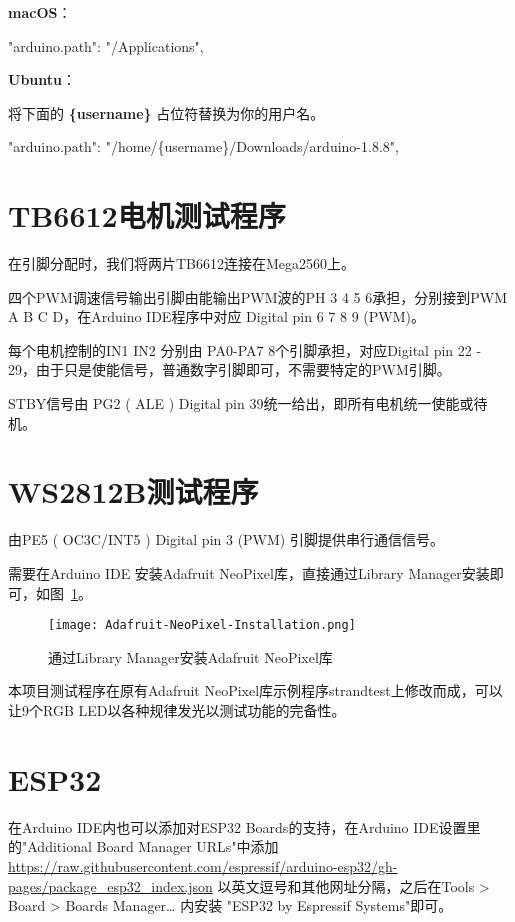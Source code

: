\begin{enumerate}
        \textbf{macOS}：
    
        \begin{tcolorbox}    
            "arduino.path": "/Applications",
        \end{tcolorbox}

        \textbf{Ubuntu}：
    
        将下面的 \textbf{\{username\}} 占位符替换为你的用户名。
        \begin{tcolorbox}
            "arduino.path": "/home/\{username\}/Downloads/arduino-1.8.8",
        \end{tcolorbox}
    \end{enumerate}



\section{TB6612电机测试程序}

在引脚分配时，我们将两片TB6612连接在Mega2560上。

四个PWM调速信号输出引脚由能输出PWM波的PH 3 4 5 6承担，分别接到PWM A B C D，在Arduino IDE程序中对应 Digital pin 6 7 8 9 (PWM)。

每个电机控制的IN1 IN2 分别由 PA0-PA7 8个引脚承担，对应Digital pin 22 - 29，由于只是使能信号，普通数字引脚即可，不需要特定的PWM引脚。

STBY信号由 PG2 ( ALE ) Digital pin 39统一给出，即所有电机统一使能或待机。

\section{WS2812B测试程序}

由PE5 ( OC3C/INT5 ) Digital pin 3 (PWM) 引脚提供串行通信信号。

需要在Arduino IDE 安装Adafruit NeoPixel库，直接通过Library Manager安装即可，如图~\ref{fig:Adafruit-NeoPixel-Installation}。

\begin{figure}[htbp]
    \centering
    \texttt{[image: Adafruit-NeoPixel-Installation.png]}
    \caption{通过Library Manager安装Adafruit NeoPixel库}
    \label{fig:Adafruit-NeoPixel-Installation}
\end{figure}

本项目测试程序在原有Adafruit NeoPixel库示例程序strandtest上修改而成，可以让9个RGB LED以各种规律发光以测试功能的完备性。


\section{ESP32}

在Arduino IDE内也可以添加对ESP32 Boards的支持，在Arduino IDE设置里的"Additional Board Manager URLs"中添加\url{https://raw.githubusercontent.com/espressif/arduino-esp32/gh-pages/package_esp32_index.json} 以英文逗号和其他网址分隔，之后在Tools > Board > Boards Manager… 内安装 "ESP32 by Espressif Systems"即可。